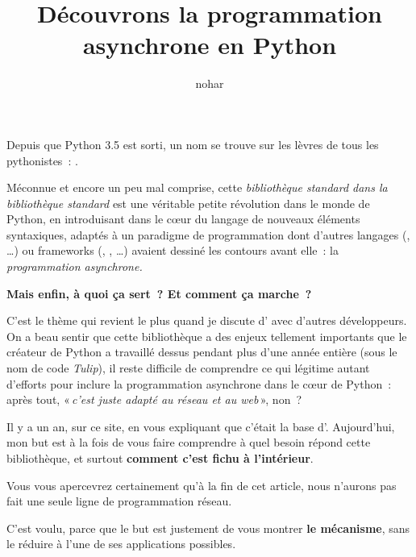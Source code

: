 \documentclass[small]{zmdocument}
\title{Découvrons la programmation asynchrone en Python}
\author{nohar}
\begin{document}
\maketitle
\tableofcontents

\begin{LevelOneIntroduction}
Depuis que Python 3.5 est sorti, un nom se trouve sur les lèvres de tous les pythonistes : .

Méconnue et encore un peu mal comprise, cette \textit{bibliothèque standard dans la bibliothèque standard} est une véritable petite révolution dans le monde de Python, en introduisant dans le cœur du langage de nouveaux éléments syntaxiques, adaptés à un paradigme de programmation dont d’autres langages (, …) ou frameworks (, , …) avaient dessiné les contours avant elle : la \textit{programmation asynchrone.}

\textbf{Mais enfin, à quoi ça sert ? Et comment ça marche ?}

C’est le thème qui revient le plus quand je discute d' avec d’autres développeurs. On a beau sentir que cette bibliothèque a des enjeux tellement importants que le créateur de Python a travaillé dessus pendant plus d’une année entière (sous le nom de code \textit{Tulip}), il reste difficile de comprendre ce qui légitime autant d’efforts pour inclure la programmation asynchrone dans le cœur de Python : après tout, « \textit{c’est juste adapté au réseau et au web} », non ?

Il y a un an,  sur ce site, en vous expliquant que c’était la base d'. Aujourd’hui, mon but est à la fois de vous faire comprendre à quel besoin répond cette bibliothèque, et surtout \textbf{comment c’est fichu à l’intérieur}.

\begin{Information}
Vous vous apercevrez certainement qu’à la fin de cet article, nous n’aurons pas fait une seule ligne de programmation réseau.
\end{Information}
C’est voulu, parce que le but est justement de vous montrer \textbf{le mécanisme}, sans le réduire à l’une de ses applications possibles.
\end{LevelOneIntroduction}
\end{document}

